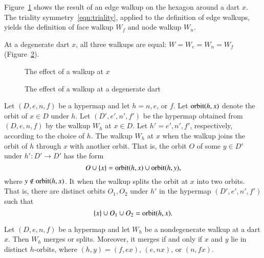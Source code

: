 Figure~\ref{fig:walk} shows
the result of an edge walkup on the hexagon around a dart $x$.
The triality symmetry~\ref{eqn:triality}, applied to the definition
of edge walkups, yields the definition of
face walkup $W_f$ and node walkup $W_n$.  

At a degenerate dart $x$, all three walkups are equal: $W=W_e=W_n=W_f$
(Figure~\ref{fig:walkdegen}).  %
%

\begin{figure}[htb]
\centering
{}
\caption{The effect of a walkup at $x$}
\label{fig:walk}
\end{figure}


\begin{figure}[htb]
\centering
{}
\caption{The effect of a walkup at a degenerate dart}
\label{fig:walkdegen}
\end{figure}


\begin{definition}\label{def:merge-split} 
Let $(D,e,n,f)$ be a hypermap and
  let $h=n,e$, or $f$.  Let ${\operatorname{orbit}}(h,x)$ denote the orbit of
  $x\in D$ under $h$.  Let $(D',e',n',f')$ be the hypermap obtained
  from $(D,e,n,f)$ by the walkup $W_h$ at $x\in D$.  Let
  $h'=e',n',f'$, respectively, according to the choice of $h$.  The
  walkup $W_h$ at $x$  when the walkup joins the orbit
  of $h$ through $x$ with another orbit.  That is, the orbit $O$ of
  some $y\in D'$ under $h':D'\to D'$ has the form
\[ 
  O \cup\{x\} = {\operatorname{orbit}}(h,x) \cup {\operatorname{orbit}}(h,y),
\] 
where $y\not\in {\operatorname{orbit}}(h,x)$.  It  when the walkup
splits the orbit at $x$ into two orbits.  That is, there are distinct
orbits $O_1,O_2$ under $h'$ in the hypermap $(D',e',n',f')$ such that
\[ 
  \{x\}\cup O_1\cup O_2 = {\operatorname{orbit}}(h,x).
\] 
%
%
%
\end{definition}

\begin{lemma}\label{lemma:merge-split} 
  Let $(D,e,n,f)$ be a hypermap and let $W_h$ be a nondegenerate
  walkup at a dart $x$.  Then $W_h$ merges or splits. Moreover, it merges if
  and only if $x$ and $y$ lie in distinct $h$-orbits, where
  $(h,y)=(f,e x)$,  $(e,n x)$, or $(n,f x)$.
\end{lemma}

